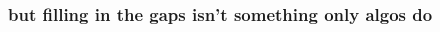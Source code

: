 \documentclass[presentation]{subfiles}
\begin{document}
\begin{frame}\frametitle{but filling in the gaps isn't something only algos do}


\begin{columns}
\begin{column}{0.5\textwidth}
  
  
  


\end{column}
\end{columns}
\end{frame}
\end{document}
